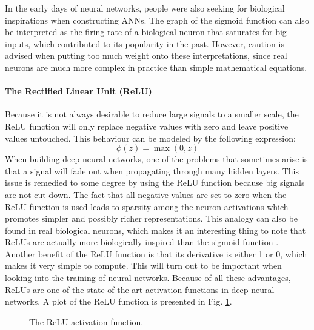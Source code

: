 In the early days of neural networks, people were also seeking for
biological inspirations when constructing ANNs. The graph of the
sigmoid function can also be interpreted as the firing rate of a
biological neuron that saturates for big inputs, which contributed to
its popularity in the past. However, caution is
advised when putting too much weight onto these interpretations, since
real neurons are much more complex in practice than simple
mathematical equations.

\paragraph{The Rectified Linear Unit (ReLU)}
\label{sec:relu}
Because it is not always desirable to reduce large signals to a
smaller scale, the ReLU function will only replace negative values
with zero and leave positive values untouched. This behaviour can be
modeled by the following expression:
\begin{equation}
  \phi(z) = \max(0, z)
\end{equation}
When building deep neural networks, one of the problems that sometimes
arise is that a signal will fade out when propagating through many
hidden layers. This issue is remedied to some degree by using the ReLU
function because big signals are not cut down. The fact that all
negative values are set to zero when the ReLU function is used leads
to sparsity among the neuron activations which promotes simpler and
possibly richer representations. This analogy can also be found in
real biological neurons, which makes it an interesting thing to note
that ReLUs are actually more biologically inspired than the sigmoid
function \cite{Glorot2011}. Another benefit of the ReLU function is
that its derivative is either 1 or 0, which makes it very simple to
compute. This will turn out to be important when
looking into the training of neural networks.
Because of all these advantages, ReLUs are one of the state-of-the-art
activation functions in deep neural networks. A plot of the ReLU
function is presented in Fig. \ref{fig:relu}.
\begin{figure}[h]
  \centering
  
  \caption{The ReLU activation function.}
  \label{fig:relu}
\end{figure}

